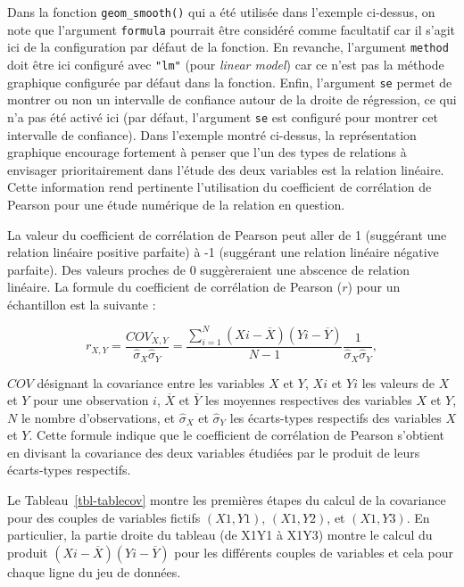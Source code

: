 \documentclass[
  letterpaper,
]{book}
\begin{document}
Dans la fonction \texttt{geom\_smooth()} qui a été utilisée dans
l'exemple ci-dessus, on note que l'argument \texttt{formula} pourrait
être considéré comme facultatif car il s'agit ici de la configuration
par défaut de la fonction. En revanche, l'argument \texttt{method} doit
être ici configuré avec \texttt{"lm"} (pour \emph{linear model}) car ce
n'est pas la méthode graphique configurée par défaut dans la fonction.
Enfin, l'argument \texttt{se} permet de montrer ou non un intervalle de
confiance autour de la droite de régression, ce qui n'a pas été activé
ici (par défaut, l'argument \texttt{se} est configuré pour montrer cet
intervalle de confiance). Dans l'exemple montré ci-dessus, la
représentation graphique encourage fortement à penser que l'un des types
de relations à envisager prioritairement dans l'étude des deux variables
est la relation linéaire. Cette information rend pertinente
l'utilisation du coefficient de corrélation de Pearson pour une étude
numérique de la relation en question.

La valeur du coefficient de corrélation de Pearson peut aller de 1
(suggérant une relation linéaire positive parfaite) à -1 (suggérant une
relation linéaire négative parfaite). Des valeurs proches de 0
suggèreraient une abscence de relation linéaire. La formule du
coefficient de corrélation de Pearson (\(r\)) pour un échantillon est la
suivante :

\[r_{X,Y} =  {\frac{COV_{X,Y}}{\hat{\sigma}_{X} \hat{\sigma}_{Y}}} =  {\frac{\sum_{i=1}^{N} (X{i} - \overline{X}) (Y{i} - \overline{Y})}{N-1}} {\frac{1}{\hat{\sigma}_{X} \hat{\sigma}_{Y}}},\]

\(COV\) désignant la covariance entre les variables \(X\) et \(Y\),
\(X{i}\) et \(Y{i}\) les valeurs de \(X\) et \(Y\) pour une observation
\(i\), \(\overline{X}\) et \(\overline{Y}\) les moyennes respectives des
variables \(X\) et \(Y\), \(N\) le nombre d'observations, et
\(\hat{\sigma}_{X}\) et \(\hat{\sigma}_{Y}\) les écarts-types respectifs
des variables \(X\) et \(Y\). Cette formule indique que le coefficient
de corrélation de Pearson s'obtient en divisant la covariance des deux
variables étudiées par le produit de leurs écarts-types respectifs.

Le Tableau~\ref{tbl-tablecov} montre les premières étapes du calcul de
la covariance pour des couples de variables fictifs \((X1,Y1)\),
\((X1,Y2)\), et \((X1,Y3)\). En particulier, la partie droite du tableau
(de X1Y1 à X1Y3) montre le calcul du produit
\((X{i} - \overline{X}) (Y{i} - \overline{Y})\) pour les différents
couples de variables et cela pour chaque ligne du jeu de données.
\end{document}
